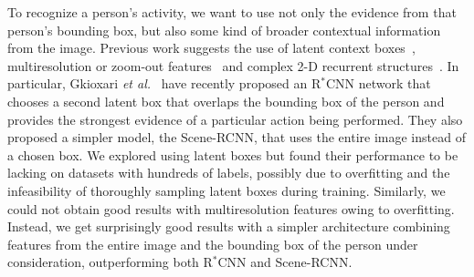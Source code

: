 \documentclass[runningheads]{llncs}
\begin{document}
To recognize a person's activity, we want to use not only the evidence from that person's bounding box, but also some kind of broader contextual information from the image. Previous work suggests the use of latent context boxes~\cite{gkioxari2015rstarcnn}, multiresolution or zoom-out features~\cite{bell2015InsideOutside,mostajabi2015feedforward} and complex 2-D recurrent structures~\cite{bell2015InsideOutside}. In particular, Gkioxari \emph{et al.}~\cite{gkioxari2015rstarcnn} have recently proposed an R$^*$CNN network that chooses a second latent box that overlaps the bounding box of the person and provides the strongest evidence of a particular action being performed. They also proposed a simpler model, the Scene-RCNN, that uses the entire image instead of a chosen box.
We explored using latent boxes but found their performance to be lacking on datasets with hundreds of labels, possibly due to overfitting and the infeasibility of thoroughly sampling latent boxes during training. Similarly, we could not obtain good results with multiresolution features owing to overfitting. Instead, we get surprisingly good results with a simpler architecture combining features from the entire image and the bounding box of the person under consideration, outperforming both R$^*$CNN and Scene-RCNN. 
    \centering
    
\end{document}
